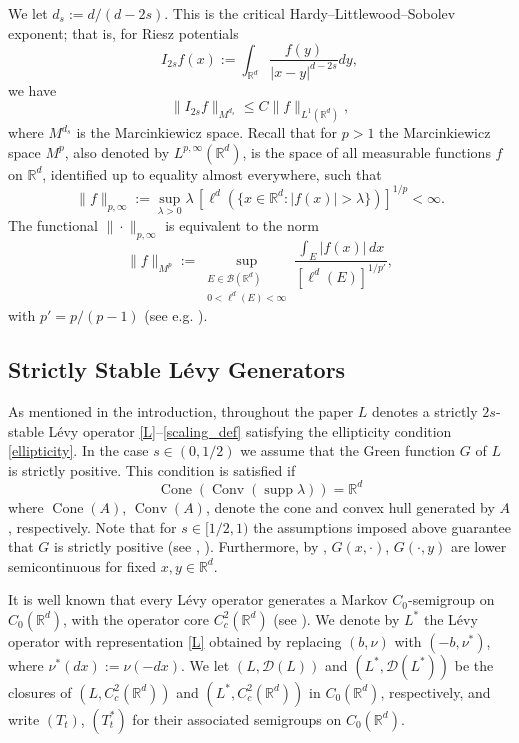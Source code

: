 \documentclass[11pt,a4paper,reqno]{amsart}
\theoremstyle{definition}
\numberwithin{equation}{section}
\begin{document}
We let    $d_s:=d/(d-2s)$. 
This is the critical  
 Hardy--Littlewood--Sobolev exponent; that is,
for Riesz potentials
$$
I_{2s} f(x):=\int_{\mathbb{R}^d} \frac{f(y)}{|x-y|^{d-2s}} d y, 
$$
we have 
$$
\|I_{2s} f\|_{M^{d_s}} \leq C\|f\|_{L^{1}(\mathbb{R}^d)},
$$
where $M^{d_s}$ is the Marcinkiewicz space.
Recall that for $p>1$ the Marcinkiewicz space
$M^p$, also denoted by $L^{p,\infty}(\mathbb{R}^d)$, is the
space of all measurable functions $f$ on $\mathbb{R}^d$, identified up to
equality almost everywhere, such that
\[
 \|f\|_{p,\infty}
 :=
 \sup_{\lambda>0}
 \lambda\,
\left[\ell^d\left(\{x\in\mathbb{R}^d:|f(x)|>\lambda\}\right)\right]^{1/p}
 <\infty.
\]
The functional $\|\cdot\|_{p,\infty}$ is equivalent to the norm
\[
 \|f\|_{M^p}
 :=
 \sup_{\substack{E\in\mathcal B(\mathbb R^d)\\
                  0<\ell^d(E)<\infty}}
\frac{\int_E |f(x)|\,dx}{ [\ell^d(E)]^{1/p'}},
\]
with  $p'=p/(p-1)$ (see e.g. \cite[Section~1.1]{Grafakos2014}).  







\subsection{Strictly Stable L\'evy Generators}

As mentioned in the introduction, throughout the paper $L$ denotes a strictly 
$2s$-stable L\'evy  operator \eqref{L}--\eqref{scaling_def} satisfying the ellipticity condition \eqref{ellipticity}.  
In the case $s\in (0,1/2)$ we assume that the Green function $G$ of $L$ is strictly positive.
This condition is satisfied if
\begin{equation}
\operatorname{Cone}(\operatorname{Conv}(\operatorname{supp} \lambda))=\mathbb R^d
\end{equation}
where $\operatorname{Cone}(A)$, $\operatorname{Conv}(A)$,  
denote the cone and  convex hull generated by $A$, respectively.
Note that for $s\in [1/2,1)$ the assumptions imposed above guarantee that $G$ is strictly positive 
(see \cite{AshbaughRajputRamaMurthySundberg1992}, \cite{PortVitale1988}). 
Furthermore, by \cite[Proposition I.10]{Bertoin},  $G(x,\cdot)$, $G(\cdot,y)$ are lower semicontinuous 
for fixed $x,y\in\mathbb R^d$.

It is well known that every L\'evy  operator generates a Markov $C_0$-semigroup on $C_0(\mathbb R^d)$,
with the operator core $C_c^2(\mathbb R^d)$ (see \cite[Corollary 2.10]{BSW}).
We denote by $L^*$ the L\'evy operator with representation \eqref{L} obtained by replacing 
$(b,\nu)$ with $(-b,\nu^*)$, where  $\nu^*(dx) := \nu(-dx)$.  
We let $(L,\mathscr{D}(L))$ and $(L^*,\mathscr{D}(L^*))$ be the closures of 
$(L,C_c^2(\mathbb{R}^d))$ and $(L^*,C_c^2(\mathbb{R}^d))$ in $C_0(\mathbb R^d)$, 
respectively, and write $(T_t)$, $(T^*_t)$ for their associated semigroups on $C_0(\mathbb{R}^d)$.  
\end{document}
